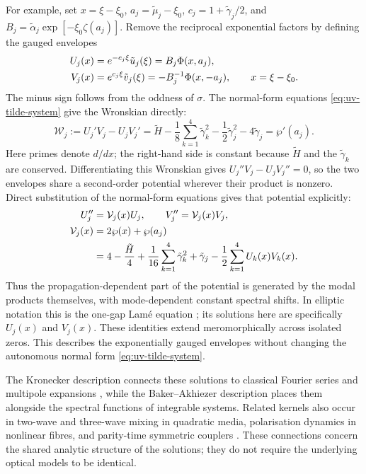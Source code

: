 \documentclass[11pt,a4paper]{article}
\numberwithin{equation}{section}
\begin{document}
For example, set $x=\xi-\xi_0$, $a_j=\tilde\mu_j-\xi_0$, $c_j=1+\tilde\gamma_j/2$, and $B_j=\tilde\alpha_j\exp[-\xi_0\zeta(a_j)]$.
Remove the reciprocal exponential factors by defining the gauged envelopes
\begin{align}
U_j(x)&=e^{-c_j\xi}\tilde u_j(\xi)=B_j\Phi(x,a_j),\notag\\
V_j(x)&=e^{c_j\xi}\tilde v_j(\xi)=-B_j^{-1}\Phi(x,-a_j),
\qquad x=\xi-\xi_0.
\label{eq:tilde-ba-pair}
\end{align}
The minus sign follows from the oddness of $\sigma$.
The normal-form equations \eqref{eq:uv-tilde-system} give the Wronskian directly:
\begin{equation}
\mathcal W_j:=U_j'V_j-U_jV_j'
=\tilde H-\frac18\sum_{k=1}^4\tilde\gamma_k^2
-\frac12\tilde\gamma_j^2-4\tilde\gamma_j
=\wp'(a_j).
\label{eq:ba-wronskian}
\end{equation}
Here primes denote $d/dx$; the right-hand side is constant because $\tilde H$ and the $\tilde\gamma_k$ are conserved.
Differentiating this Wronskian gives $U_j''V_j-U_jV_j''=0$, so the two envelopes share a second-order potential wherever their product is nonzero.
Direct substitution of the normal-form equations gives that potential explicitly:
\begin{align}
U_j''&=\mathcal V_j(x)U_j,\qquad
V_j''=\mathcal V_j(x)V_j,\notag\\
\mathcal V_j(x)&=2\wp(x)+\wp(a_j)\notag\\
&=4-\frac{\tilde H}{4}+\frac1{16}\sum_{k=1}^4\tilde\gamma_k^2
+\tilde\gamma_j-\frac12\sum_{k=1}^4 U_k(x)V_k(x).
\label{eq:ba-lame}
\end{align}
Thus the propagation-dependent part of the potential is generated by the modal products themselves, with mode-dependent constant spectral shifts.
In elliptic notation this is the one-gap Lam\'e equation \cite[Eq.~(1.9)]{kricheverEllipticSolutionsNonlinear1994}; its solutions here are specifically $U_j(x)$ and $V_j(x)$.
These identities extend meromorphically across isolated zeros.
This describes the exponentially gauged envelopes without changing the autonomous normal form \eqref{eq:uv-tilde-system}.

The Kronecker description connects these solutions to classical Fourier series \cite{whittakerCourseModernAnalysis2021} and multipole expansions \cite{weilEllipticFunctionsAccording1976,charolloisEllipticFunctionsAccording2016}, while the Baker--Akhiezer description places them alongside the spectral functions of integrable systems.
Related kernels also occur in two-wave and three-wave mixing in quadratic media, polarisation dynamics in nonlinear fibres, and parity-time symmetric couplers \cite{heskethGeneralComplexEnvelope2015}.
These connections concern the shared analytic structure of the solutions; they do not require the underlying optical models to be identical.
\end{document}
